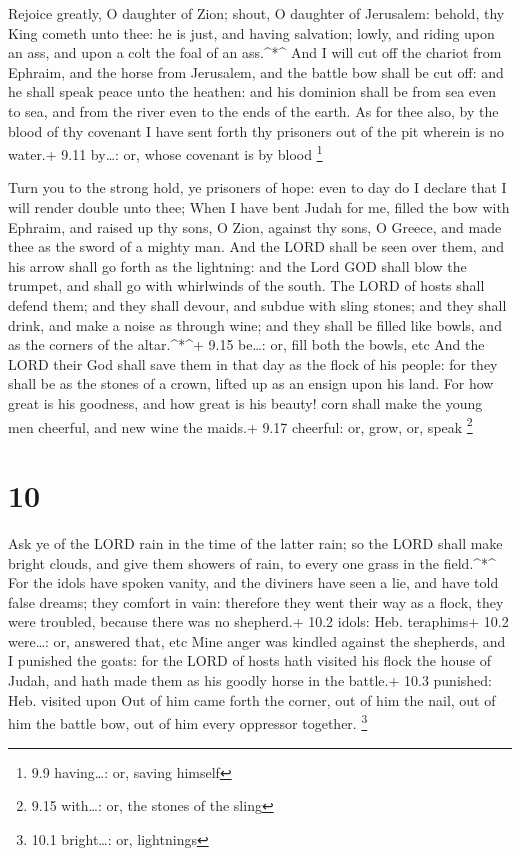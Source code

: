 Rejoice greatly, O daughter of Zion; shout, O daughter of
Jerusalem: behold, thy King cometh unto thee: he is just, and having
salvation; lowly, and riding upon an ass, and upon a colt the foal of an
ass.\^{}*\^{}  And I will cut off the chariot from Ephraim,
and the horse from Jerusalem, and the battle bow shall be cut off: and
he shall speak peace unto the heathen: and his dominion shall be from
sea even to sea, and from the river even to the ends of the earth.
 As for thee also, by the blood of thy covenant I have sent
forth thy prisoners out of the pit wherein is no water.+ 9.11 by\ldots:
or, whose covenant is by blood \footnote{9.9 having\ldots: or, saving
  himself}

 Turn you to the strong hold, ye prisoners of hope: even to
day do I declare that I will render double unto thee;  When
I have bent Judah for me, filled the bow with Ephraim, and raised up thy
sons, O Zion, against thy sons, O Greece, and made thee as the sword of
a mighty man.  And the LORD shall be seen over them, and
his arrow shall go forth as the lightning: and the Lord GOD shall blow
the trumpet, and shall go with whirlwinds of the south. 
The LORD of hosts shall defend them; and they shall devour, and subdue
with sling stones; and they shall drink, and make a noise as through
wine; and they shall be filled like bowls, and as the corners of the
altar.\^{}*\^{}+ 9.15 be\ldots: or, fill both the bowls, etc
 And the LORD their God shall save them in that day as the
flock of his people: for they shall be as the stones of a crown, lifted
up as an ensign upon his land.  For how great is his
goodness, and how great is his beauty! corn shall make the young men
cheerful, and new wine the maids.+ 9.17 cheerful: or, grow, or, speak
\footnote{9.15 with\ldots: or, the stones of the sling}

\hypertarget{section-9}{%
\section{10}\label{section-9}}

 Ask ye of the LORD rain in the time of the latter rain; so
the LORD shall make bright clouds, and give them showers of rain, to
every one grass in the field.\^{}*\^{}  For the idols have
spoken vanity, and the diviners have seen a lie, and have told false
dreams; they comfort in vain: therefore they went their way as a flock,
they were troubled, because there was no shepherd.+ 10.2 idols: Heb.
teraphims+ 10.2 were\ldots: or, answered that, etc  Mine
anger was kindled against the shepherds, and I punished the goats: for
the LORD of hosts hath visited his flock the house of Judah, and hath
made them as his goodly horse in the battle.+ 10.3 punished: Heb.
visited upon  Out of him came forth the corner, out of him
the nail, out of him the battle bow, out of him every oppressor
together. \footnote{10.1 bright\ldots: or, lightnings}

